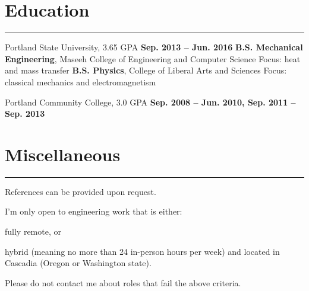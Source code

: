 \section{Education}
	\noindent\rule{\textwidth}{\hlinewidth}
	\begin{innerlist}
	\item Portland State University, 3.65 GPA	\hfill\textbf{Sep. 2013 -- Jun. 2016}
		\subitem \textbf{B.S. Mechanical Engineering}, Maseeh College of Engineering and Computer Science
		\subsubitem Focus: heat and mass transfer
		\subitem\textbf{B.S. Physics}, College of Liberal Arts and Sciences
		\subsubitem Focus: classical mechanics and electromagnetism
		\subitem 
	\item Portland Community College, 3.0 GPA	\hfill\textbf{Sep. 2008 -- Jun. 2010, Sep. 2011 -- Sep. 2013}
	\end{innerlist}


\pagebreak
\section{Miscellaneous}
	\noindent\rule{\textwidth}{\hlinewidth}
    References can be provided upon request.

    I'm only open to engineering work that is either:
    \begin{innerlist}
    \item fully remote, or
    \item hybrid (meaning no more than 24 in-person hours per week) and located in Cascadia (Oregon or Washington state).
    \end{innerlist}
    Please do not contact me about roles that fail the above criteria.

